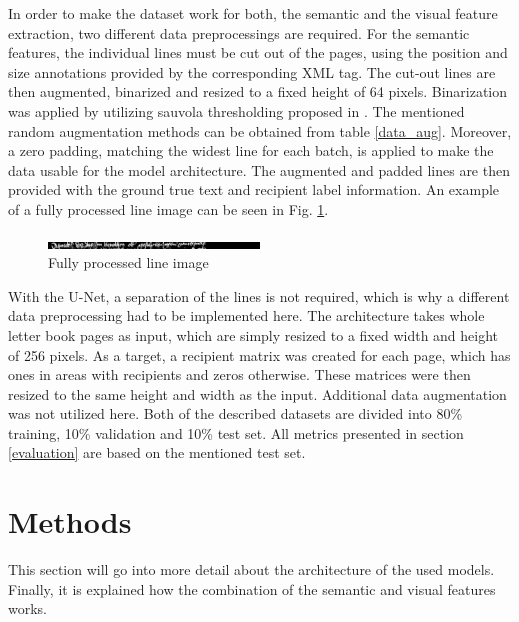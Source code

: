 \documentclass[conference]{IEEEtran}
\begin{document}
In order to make the dataset work for both, the semantic and the visual feature extraction, two different data preprocessings are required. For the semantic features, the individual lines must be cut out of the pages, using the position and size annotations provided by the corresponding XML tag. The cut-out lines are then augmented, binarized and resized to a fixed height of 64 pixels. Binarization was applied by utilizing sauvola thresholding proposed in \cite{SAUVOLA2000225}. The mentioned random augmentation methods can be obtained from table \ref{data_aug}. Moreover, a zero padding, matching the widest line for each batch, is applied to make the data usable for the model architecture. The augmented and padded lines are then provided with the ground true text and recipient label information. An example of a fully processed line image can be seen in Fig. \ref{line_img}. \newline

\begin{figure}[htbp]
    \centering
    \includegraphics[width=0.5\textwidth]{figures/line_img.png}
    \caption{Fully processed line image}
    \label{line_img}
\end{figure}

With the U-Net, a separation of the lines is not required, which is why a different data preprocessing had to be implemented here. The architecture takes whole letter book pages as input, which are simply resized to a fixed width and height of 256 pixels. As a target, a recipient matrix was created for each page, which has ones in areas with recipients and zeros otherwise. These matrices were then resized to the same height and width as the input. Additional data augmentation was not utilized here.
Both of the described datasets are divided into 80\% training, 10\% validation and 10\% test set. All metrics presented in section \ref{evaluation} are based on the mentioned test set.

\section{Methods}
This section will go into more detail about the architecture of the used models. Finally, it is explained how the combination of the semantic and visual features works.
\end{document}
